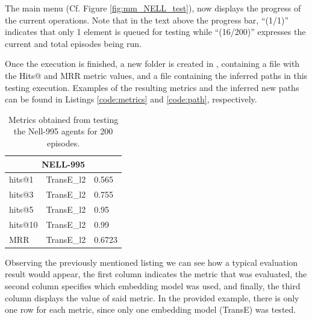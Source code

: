 The main menu (Cf. Figure \ref{fig:mm_NELL_test}), now displays the progress of the current operations. Note that in the text above the progress bar, ``(1/1)'' indicates that only 1 element is queued for testing while ``(16/200)'' expresses the current and total episodes being run.

Once the execution is finished, a new folder is created in , containing a  file with the Hits@ and MRR metric values, and a  file containing the inferred paths in this testing execution. Examples of the resulting metrics and the inferred new paths can be found in Listings \ref{code:metrics} and \ref{code:path}, respectively.



\begin{table}[!h]
    \centering
    \begin{tabular}{l|l|l}
    \hline
        \multicolumn{3}{c}{NELL-995} \\ \hline
        hits@1 & TransE\_l2 & 0.565 \\ \hline
        hits@3 & TransE\_l2 & 0.755 \\ \hline
        hits@5 & TransE\_l2 & 0.95 \\ \hline
        hits@10 & TransE\_l2 & 0.99 \\ \hline
        MRR & TransE\_l2 & 0.6723 \\ \hline
    \end{tabular}
    \caption{Metrics obtained from testing the Nell-995 agents for 200 episodes.}
    \label{tab:metrics}
\end{table}




Observing the previously mentioned listing we can see how a typical evaluation result  would appear, the first column indicates the metric that was evaluated, the second column specifies which embedding model was used, and finally, the third column displays the value of said metric. In the provided example, there is only one row for each metric, since only one embedding model (TransE) was tested.

